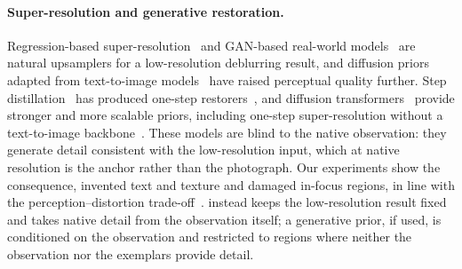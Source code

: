 \paragraph{Super-resolution and generative restoration.}
Regression-based super-resolution~\cite{liang2021swinir,chen2023hat} and GAN-based real-world
models~\cite{wang2021realesrgan,zhang2021bsrgan} are natural upsamplers for a low-resolution
deblurring result, and diffusion priors~\cite{saharia2022sr3,whang2022deblurring,xia2023diffir,rombach2022ldm}
adapted from text-to-image models~\cite{wang2024stablesr,lin2024diffbir,yu2024supir,wu2024seesr} have
raised perceptual quality further. Step distillation~\cite{song2023consistency,sauer2024add,yin2024dmd}
has produced one-step restorers~\cite{wang2024sinsr,wu2024osediff,zhang2024s3diff}, and diffusion
transformers~\cite{peebles2023dit,esser2024sd3} provide stronger and more scalable priors, including
one-step super-resolution without a text-to-image backbone~\cite{wu2026vosr}. These
models are blind to the native observation: they generate detail consistent with the low-resolution
input, which at native resolution is the anchor rather than the photograph. Our experiments show the
consequence, invented text and texture and damaged in-focus regions, in line with the
perception--distortion trade-off~\cite{blau2018perception}. \method instead keeps
the low-resolution result fixed and takes native detail from the observation itself; a generative
prior, if used, is conditioned on the observation and restricted to regions where neither the
observation nor the exemplars provide detail.

